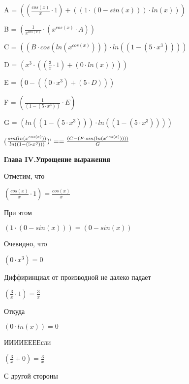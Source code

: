 \documentclass[12pt,a4paper,fleqn]{article}
\begin{document}
\begin{center}
A = $((\frac{cos(x)}{x} \cdot 1) + ((1 \cdot (0 - sin(x))) \cdot ln(x)))$\end{center}
\begin{center}
B = $(\frac{1}{x^{cos(x)}} \cdot (x^{cos(x)} \cdot A))$\end{center}
\begin{center}
C = $((B \cdot cos(ln(x^{cos(x)}))) \cdot ln((1 - (5 \cdot x^{3}))))$\end{center}
\begin{center}
D = $(x^{3} \cdot ((\frac{3}{x} \cdot 1) + (0 \cdot ln(x))))$\end{center}
\begin{center}
E = $(0 - ((0 \cdot x^{3}) + (5 \cdot D)))$\end{center}
\begin{center}
F = $(\frac{1}{(1 - (5 \cdot x^{3}))} \cdot E)$\end{center}
\begin{center}
G = $(ln((1 - (5 \cdot x^{3}))) \cdot ln((1 - (5 \cdot x^{3}))))$\end{center}
\begin{center}
 ($\frac{sin(ln(x^{cos(x)}))}{ln((1 - (5 \cdot x^{3})))})`
 =  = \frac{(C - (F \cdot sin(ln(x^{cos(x)}))))}{G}$\end{center}
\newpage \textbf{\LARGE Глава IV.Упрощение выражения}

Отметим, что

\begin{center}
$(\frac{cos(x)}{x} \cdot 1) = \frac{cos(x)}{x}$\end{center}
При этом

\begin{center}
$(1 \cdot (0 - sin(x))) = (0 - sin(x))$\end{center}
Очевидно, что

\begin{center}
$(0 \cdot x^{3}) = 0$\end{center}
Диффиринциал от производной не далеко падает

\begin{center}
$(\frac{3}{x} \cdot 1) = \frac{3}{x}$\end{center}
Откуда

\begin{center}
$(0 \cdot ln(x)) = 0$\end{center}
ИИИИЕЕЕЕсли

\begin{center}
$(\frac{3}{x} + 0) = \frac{3}{x}$\end{center}
С другой стороны
\end{document}
